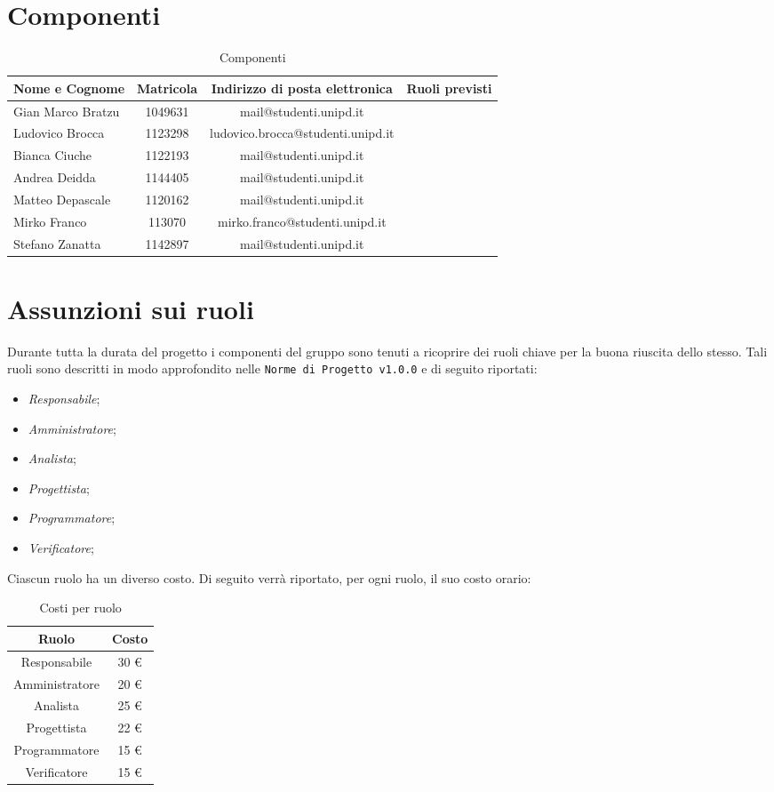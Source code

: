 \section{Componenti}
	\begin{table}[htp]
		\centering
		\caption{Componenti}
		\begin{tabularx}{\textwidth}{|X|c|c|X|}
			\hline
			\textbf{Nome e Cognome} & \textbf{Matricola} & \textbf{Indirizzo di posta elettronica} & \textbf{Ruoli previsti} \\
			\hline 
			Gian Marco Bratzu & 1049631 & mail@studenti.unipd.it & \\
			Ludovico Brocca & 1123298 & ludovico.brocca@studenti.unipd.it & \\
			Bianca Ciuche & 1122193 & mail@studenti.unipd.it & \\
			Andrea Deidda & 1144405 & mail@studenti.unipd.it & \\
			Matteo Depascale & 1120162 & mail@studenti.unipd.it & \\
			Mirko Franco & 113070 &  mirko.franco@studenti.unipd.it & \\
			Stefano Zanatta & 1142897 & mail@studenti.unipd.it & \\
			\hline
		\end{tabularx}
	\end{table}
\section{Assunzioni sui ruoli}
	Durante tutta la durata del progetto i componenti del gruppo sono tenuti a ricoprire dei ruoli chiave per la buona riuscita dello stesso.
	Tali ruoli sono descritti in modo approfondito nelle \texttt{Norme di Progetto v1.0.0} e di seguito riportati:
	\begin{itemize}
		\item 	\textit{Responsabile};
		\item \textit{Amministratore};
		\item \textit{Analista};
		\item \textit{Progettista};
		\item \textit{Programmatore};
		\item \textit{Verificatore};
	\end{itemize}
	Ciascun ruolo ha un diverso costo. Di seguito verrà riportato, per ogni ruolo, il suo costo orario:
	\begin{table}[htp]
		\centering
		\caption{Costi per ruolo}
		\begin{tabular}{|c|c|}
			\hline
			\textbf{Ruolo} & \textbf{Costo} \\
			\hline
			Responsabile & 30 \euro \\
			Amministratore & 20 \euro \\
			Analista & 25 \euro \\
			Progettista & 22 \euro \\
			Programmatore & 15 \euro \\
			Verificatore & 15 \euro \\
			\hline
		\end{tabular}
	\end{table}